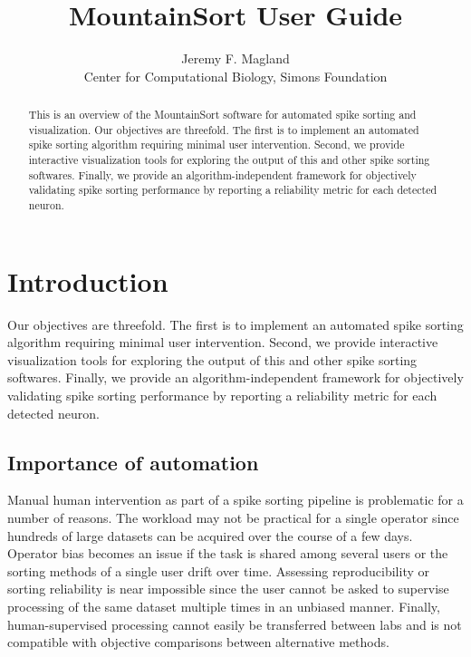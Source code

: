 \documentclass[hidelinks,10pt]{article}
\begin{document}
\def\spacingset#1{\renewcommand{\baselinestretch}%
{#1}\small\normalsize} \spacingset{1}



\title{\bf MountainSort User Guide}
\author{Jeremy F. Magland\hspace{.2cm}\\
  Center for Computational Biology, Simons Foundation\\
  }
\maketitle

\bigskip
\begin{abstract}
This is an overview of the MountainSort software for automated spike sorting and visualization. Our objectives are threefold. The first is to implement an automated spike sorting algorithm requiring minimal user intervention. Second, we provide interactive visualization tools for exploring the output of this and other spike sorting softwares. Finally, we provide an algorithm-independent framework for objectively validating spike sorting performance by reporting a reliability metric for each detected neuron.
\end{abstract}

\tableofcontents

\vfill

\newpage

\section {Introduction}

Our objectives are threefold. The first is to implement an automated spike sorting algorithm requiring minimal user intervention. Second, we provide interactive visualization tools for exploring the output of this and other spike sorting softwares. Finally, we provide an algorithm-independent framework for objectively validating spike sorting performance by reporting a reliability metric for each detected neuron.

\subsection {Importance of automation}

Manual human intervention as part of a spike sorting pipeline is problematic for a number of reasons. The workload may not be practical for a single operator since hundreds of large datasets can be acquired over the course of a few days. Operator bias becomes an issue if the task is shared among several users or the sorting methods of a single user drift over time. Assessing reproducibility or sorting reliability is near impossible since the user cannot be asked to supervise processing of the same dataset multiple times in an unbiased manner. Finally, human-supervised processing cannot easily be transferred between labs and is not compatible with objective comparisons between alternative methods. 
\end{document}
